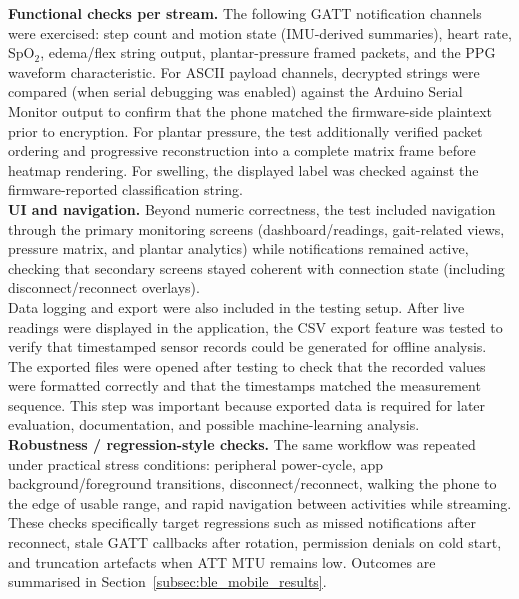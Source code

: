 \noindent \textbf{Functional checks per stream.} The following GATT notification channels were
exercised: step count and motion state (IMU-derived summaries), heart rate, SpO$_2$, edema/flex
string output, plantar-pressure framed packets, and the PPG waveform characteristic. For ASCII
payload channels, decrypted strings were compared (when serial debugging was enabled) against the
Arduino Serial Monitor output to confirm that the phone matched the firmware-side plaintext prior
to encryption. For plantar pressure, the test additionally verified packet ordering and
progressive reconstruction into a complete matrix frame before heatmap rendering. For swelling,
the displayed label was checked against the firmware-reported classification string. \\

\noindent \textbf{UI and navigation.} Beyond numeric correctness, the test included navigation
through the primary monitoring screens (dashboard/readings, gait-related views, pressure matrix,
and plantar analytics) while notifications remained active, checking that secondary screens stayed
coherent with connection state (including disconnect/reconnect overlays). \\




\noindent Data logging and export were also included in the testing setup. After live readings were displayed in the application, the CSV export feature was tested to verify that timestamped sensor records could be generated for offline analysis. The exported files were opened after testing to check that the recorded values were formatted correctly and that the timestamps matched the measurement sequence. This step was important because exported data is required for later evaluation, documentation, and possible machine-learning analysis. \\




\noindent \textbf{Robustness / regression-style checks.} The same workflow was repeated under
practical stress conditions: peripheral power-cycle, app background/foreground transitions,
disconnect/reconnect, walking the phone to the edge of usable range, and rapid navigation between
activities while streaming. These checks specifically target regressions such as missed
notifications after reconnect, stale GATT callbacks after rotation, permission denials on cold
start, and truncation artefacts when ATT MTU remains low. Outcomes are summarised in
Section~\ref{subsec:ble_mobile_results}. \\




